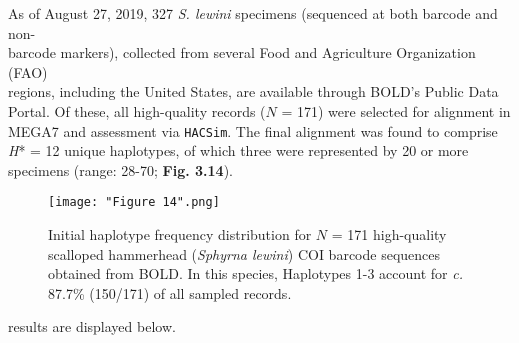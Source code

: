 As of August 27, 2019, 327 \textit{S. lewini} specimens (sequenced at both barcode and non-\\barcode markers), collected from several Food and Agriculture Organization (FAO) \\ regions, including the United States, are available through BOLD's Public Data Portal. Of these, all high-quality records ($N$ = 171) were selected for alignment in MEGA7 and assessment via {\tt HACSim}. The final alignment was found to comprise \textit{H}* = 12 unique haplotypes, of which three were represented by 20 or more specimens (range: 28-70; \textbf{Fig. 3.14}).


\begin{figure}[H]

\centering

\texttt{[image: "Figure 14".png]}

\caption{Initial haplotype frequency distribution for $N$ = 171 high-quality scalloped hammerhead (\textit{Sphyrna lewini}) COI barcode sequences obtained from BOLD. In this species, Haplotypes 1-3 account for \textit{c.} 87.7\% (150/171) of all sampled records.}

\end{figure}
 

 results are displayed below.

\vspace{3mm}

